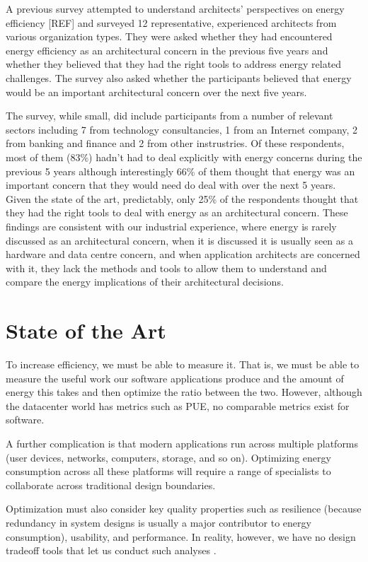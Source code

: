 A previous survey attempted to understand architects' perspectives on energy efficiency [REF] and surveyed 12 representative, experienced architects from various organization types. They were asked whether they had encountered energy efficiency as an architectural concern in the previous five years and whether they believed that they had the right tools to address energy related challenges. The survey also asked whether the participants believed that energy would be an important architectural concern over the next five years.

The survey, while small, did include participants from a number of relevant sectors including 7 from technology consultancies, 1 from an Internet company, 2 from banking and finance and 2 from other instrustries.  Of these respondents, most of them (83\%) hadn't had to deal explicitly with energy concerns during the previous 5 years although interestingly 66\% of them thought that energy was an important concern that they would need do deal with over the next 5 years.  Given the state of the art, predictably, only 25\% of the respondents thought that they had the right tools to deal with energy as an architectural concern.  These findings are consistent with our industrial experience, where energy is rarely discussed as an architectural concern, when it is discussed it is usually seen as a hardware and data centre concern, and when application architects are concerned with it, they lack the methods and tools to allow them to understand and compare the energy implications of their architectural decisions.

\section{State of the Art}

To increase efficiency, we must be able to measure it. That is, we must be able to measure the useful work our software applications produce and the amount of energy this takes and then optimize the ratio between the two. However, although the datacenter world has metrics such as PUE, no comparable metrics exist for software.

A further complication is that modern applications run across multiple platforms (user devices, networks, computers, storage, and so on). Optimizing energy consumption across all these platforms will require a range of specialists to collaborate across traditional design boundaries.

Optimization must also consider key quality properties such as resilience (because redundancy in system designs is usually a major contributor to energy consumption), usability, and performance. In reality, however, we have no design tradeoff tools that let us conduct such analyses \cite{bashroush2016-datacentreenergy}.


